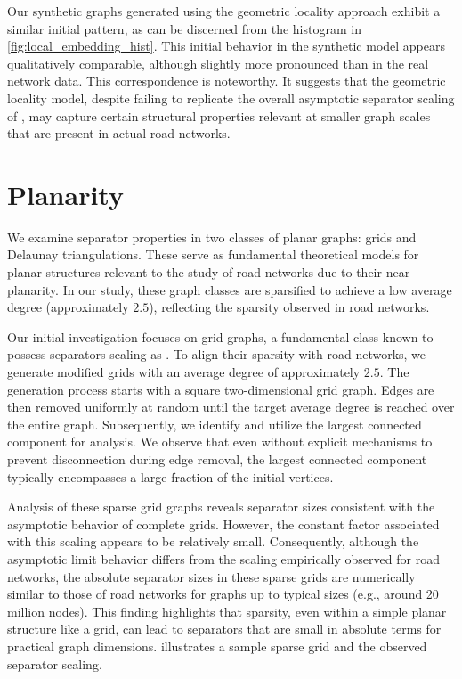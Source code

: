 Our synthetic graphs generated using the geometric locality approach exhibit a similar initial pattern, as can be discerned from the histogram in \cref{fig:local_embedding_hist}.
This initial behavior in the synthetic model appears qualitatively comparable, although slightly more pronounced than in the real network data.
This correspondence is noteworthy.
It suggests that the geometric locality model, despite failing to replicate the overall asymptotic separator scaling of , may capture certain structural properties relevant at smaller graph scales that are present in actual road networks.

\section{Planarity}
\label{sec:synthetic:planarity}

We examine separator properties in two classes of planar graphs: grids and Delaunay triangulations.
These serve as fundamental theoretical models for planar structures relevant to the study of road networks due to their near-planarity.
In our study, these graph classes are sparsified to achieve a low average degree (approximately \(2.5\)), reflecting the sparsity observed in road networks.

Our initial investigation focuses on grid graphs, a fundamental class known to possess separators scaling as .
To align their sparsity with road networks, we generate modified grids with an average degree of approximately \(2.5\).
The generation process starts with a square two-dimensional grid graph.
Edges are then removed uniformly at random until the target average degree is reached over the entire graph.
Subsequently, we identify and utilize the largest connected component for analysis.
We observe that even without explicit mechanisms to prevent disconnection during edge removal, the largest connected component typically encompasses a large fraction of the initial vertices.

Analysis of these sparse grid graphs reveals separator sizes consistent with the  asymptotic behavior of complete grids.
However, the constant factor associated with this scaling appears to be relatively small.
Consequently, although the asymptotic limit behavior differs from the  scaling empirically observed for road networks, the absolute separator sizes in these sparse grids are numerically similar to those of road networks for graphs up to typical sizes (e.g., around 20 million nodes).
This finding highlights that sparsity, even within a simple planar structure like a grid, can lead to separators that are small in absolute terms for practical graph dimensions.
 illustrates a sample sparse grid and the observed separator scaling.

